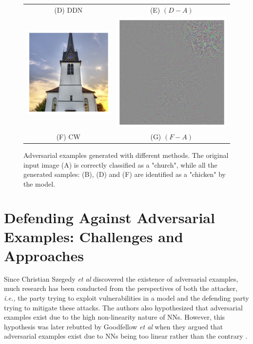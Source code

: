 \begin{figure}[htb]
\begin{tabular}{@{}cc@{}}
        \\
        (D) DDN & (E) $(D - A)$ \\
        \includegraphics[width=.32\columnwidth]{Figures/related/attacks/cw_0.62_chicken.png}
                &
        \includegraphics[width=.32\columnwidth]{Figures/related/attacks/cw_0.62_chicken_diff2.png}
        \\
        (F) CW  & (G) $(F - A)$
    \end{tabular}
    \caption{ Adversarial examples generated with different methods. The
        original input image (A) is correctly classified as a "church", while
        all the generated samples: (B), (D) and (F) are identified as a
        "chicken" by the model. }
    \label{fig:samples_ae}
\end{figure}

\clearpage


\section{Defending Against Adversarial Examples: Challenges and Approaches}
\label{sec:defending_adgainst_adversarial_examples}

Since Christian Szegedy \emph{et al} \cite{szegedy_intriguing_2014} discovered
the existence of adversarial examples, much research has been conducted from the
perspectives of both the attacker, \emph{i.e.,} the party trying to exploit
vulnerabilities in a model and the defending party trying to mitigate these
attacks. The authors also hypothesized that adversarial examples exist due to
the high non-linearity nature of NNs. However, this hypothesis was later
rebutted by Goodfellow \emph{et al} when they argued that adversarial examples
exist due to NNs being too linear rather than the contrary
\cite{goodfellow_explaining_2015}.

